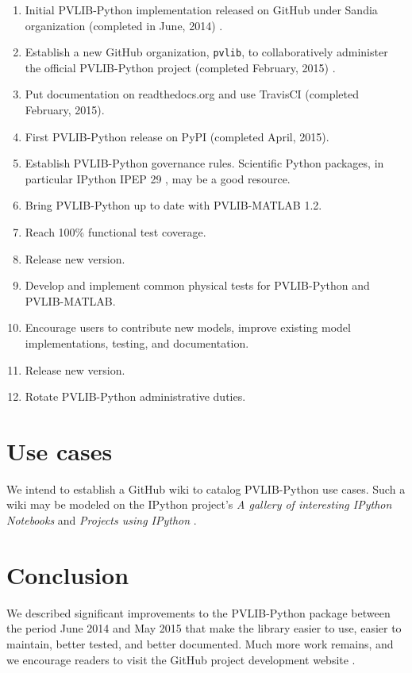\documentclass[conference]{IEEEtran}
\begin{document}
\begin{enumerate}
\item Initial PVLIB-Python implementation released on GitHub under Sandia organization (completed in June, 2014) \cite{sandia-github}.
\item Establish a new GitHub organization, \texttt{pvlib}, to collaboratively administer the official PVLIB-Python project (completed February, 2015) \cite{pvlib-github}.
\item Put documentation on readthedocs.org \cite{pvlib-rtd} and use TravisCI (completed February, 2015).
\item First PVLIB-Python release on PyPI \cite{pvlib-pypi} (completed April, 2015).
\item Establish PVLIB-Python governance rules. Scientific Python packages, in particular IPython IPEP 29 \cite{ipython-gov}, may be a good resource.
\item Bring PVLIB-Python up to date with PVLIB-MATLAB 1.2.
\item Reach 100\% functional test coverage.
\item Release new version.
\item Develop and implement common physical tests for PVLIB-Python and PVLIB-MATLAB.
\item Encourage users to contribute new models, improve existing model implementations, testing, and documentation.
\item Release new version.
\item Rotate PVLIB-Python administrative duties.
\end{enumerate}


\section{Use cases}

We intend to establish a GitHub wiki to catalog PVLIB-Python use cases. Such a wiki may be modeled on the IPython project's \emph{A gallery of interesting IPython Notebooks} and \emph{Projects using IPython} \cite{ipythonwiki}. 


\section{Conclusion}
We described significant improvements to the PVLIB-Python package between the period June 2014 and May 2015 that make the library easier to use, easier to maintain, better tested, and better documented. 
Much more work remains, and we encourage readers to visit the GitHub project development website \cite{pvlib-github}.
\end{document}
